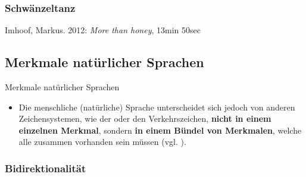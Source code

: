 \begin{frame}
\frametitle{Schwänzeltanz}

Imhoof, Markus. 2012: \emph{More than honey}, 13min 50sec

\end{frame}


\subsection{Merkmale natürlicher Sprachen}
	
\begin{frame}{Merkmale natürlicher Sprachen}

\begin{itemize}
	\item Die menschliche (natürliche) Sprache unterscheidet sich jedoch von anderen Zeichensystemen, wie der  oder den Verkehrszeichen, \textbf{nicht in einem einzelnen Merkmal}, sondern \textbf{in einem Bündel von Merkmalen}, welche alle zusammen vorhanden sein müssen (vgl. \citealp{Hockett60a}).
\end{itemize}

\end{frame}


\subsubsection{Bidirektionalität}

